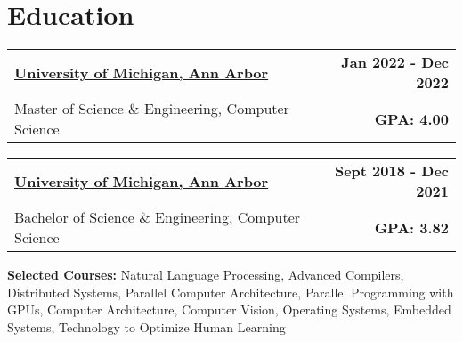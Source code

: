 \documentclass[10pt]{extreport}
\makeatletter
\newcommand{\resumeSubheading}[4]{
  \vspace{-1pt}
    \begin{tabular*}{1.0\textwidth}{l@{\extracolsep{\fill}}r}
      \textbf{#1} & \textbf{#2}  \vspace{1mm} \\
      {#3} & \textbf{#4} \\
    \end{tabular*}\vspace{-3pt}
}
\makeatother
\begin{document}
\vspace{-1.5mm}

\section{Education}
        \resumeSubheading{\underline{University of Michigan, Ann Arbor}} {Jan 2022 - Dec 2022}
      {Master of Science \& Engineering, Computer Science}{ GPA: 4.00}
     
      \vspace{2mm}
    \resumeSubheading{\underline{University of Michigan, Ann Arbor}}{Sept 2018 - Dec 2021}
      {Bachelor of Science \& Engineering, Computer Science}{GPA: 3.82}
            \vspace{2mm}

      {\textbf{Selected Courses:} Natural Language Processing, Advanced Compilers, Distributed Systems, Parallel Computer Architecture, Parallel Programming with GPUs, Computer Architecture, Computer Vision, Operating Systems, Embedded Systems, Technology to Optimize Human Learning}{}

\vspace{-1.5mm}
\vspace{-5pt}
\end{document}
